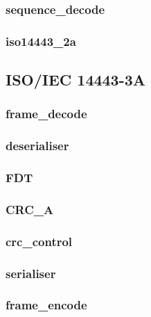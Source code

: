 \documentclass[a4paper, twoside, 11pt]{report}
\begin{document}
\FloatBarrier
\subsubsection{sequence\_decode}
\label{sec:sequence_decode}

\FloatBarrier
\subsubsection{iso14443\_2a}

\FloatBarrier
\subsection{ISO/IEC 14443-3A}

\FloatBarrier
\subsubsection{frame\_decode}

\FloatBarrier
\subsubsection{deserialiser}

\FloatBarrier
\subsubsection{FDT}

\FloatBarrier
\subsubsection{CRC\_A}

\FloatBarrier
\subsubsection{crc\_control}

\FloatBarrier
\subsubsection{serialiser}

\FloatBarrier
\subsubsection{frame\_encode}

\FloatBarrier
\end{document}
